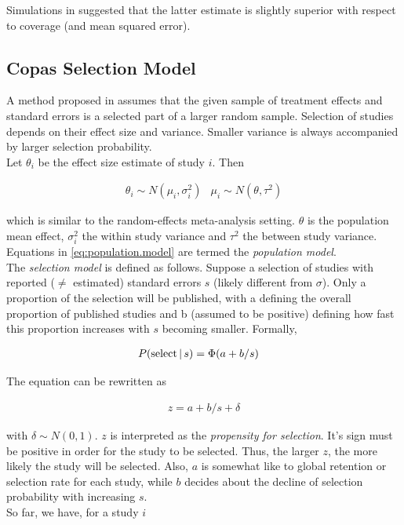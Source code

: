 \documentclass[11pt,a4paper,twoside]{book}\usepackage[]{graphicx}\usepackage[]{color}
\begin{document}
Simulations in \citet{limitmeta} suggested that the latter estimate is slightly superior with respect to coverage (and mean squared error).



\subsection{Copas Selection Model} \label{sec:copas}

A method proposed in \cite{Copas1,Copas2,Copas3} 
assumes that the given sample of treatment effects and standard errors is a selected part of a larger random sample. Selection of studies depends on their effect size and variance. Smaller variance is always accompanied by larger selection probability. \\
Let $\theta_i$ be the effect size estimate of study $i$. Then 

\begin{align}
\theta_i \sim N(\mu_i, \sigma_i^2) &
\mu_i \sim N(\theta, \tau^2) \label{eq:population.model}
\end{align}

which is similar to the random-effects meta-analysis setting. $\theta$ is the population mean effect, $\sigma_i^2$ the within study variance and $\tau^2$ the between study variance. Equations in \eqref{eq:population.model} are termed the \textit{population model}. \\
The \textit{selection model} is defined as follows. Suppose a selection of studies with reported ($\neq$ estimated) standard errors $s$ (likely different from $\sigma$). Only a proportion of the selection will be published, with a defining the overall proportion of published studies and b (assumed to be positive) defining how fast this proportion increases with $s$ becoming smaller. Formally,

\begin{align}
P(\textrm{select}\given s) &= \Phi(a + b/s) \nonumber %
\end{align}

The equation can be rewritten as 

\begin{align}
z = a + b/s + \delta \nonumber %
\end{align}

with $\delta \sim N(0,1)$. $z$ is interpreted as the \textit{propensity for selection}. It's sign must be positive in order for the study to be selected. Thus, the larger $z$, the more likely the study will be selected. Also, $a$ is somewhat like to global retention or selection rate for each study, while $b$ decides about the decline of selection probability with increasing $s$.\\
So far, we have, for a study $i$
\end{document}
